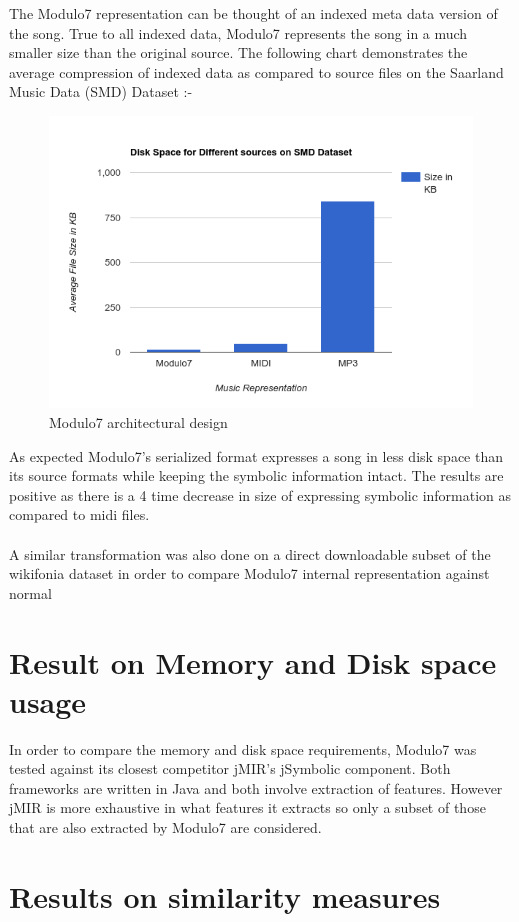 \noindent The Modulo7 representation can be thought of an indexed meta data version of the song. True to all indexed data, Modulo7 represents the song in a much smaller size than the original source. The following chart demonstrates the average compression of indexed data as compared to source files on the Saarland Music Data (SMD) Dataset \cite{saarlandmsd}:-
\begin{figure}
\centering
\includegraphics[width=\textwidth]{Modulo7SMDBarGraph.png}
\makeatletter
\let\@currsize\normalsize
\caption{Modulo7 architectural design}
\label{fig:figure}
\end{figure}
As expected Modulo7's serialized format expresses a song in less disk space than its source formats while keeping the symbolic information intact. The results are positive as there is a 4 time decrease in size of expressing symbolic information as compared to midi files. \\\\
A similar transformation was also done on a direct downloadable subset of the wikifonia dataset in order to compare Modulo7 internal representation against normal 

\section{Result on Memory and Disk space \\ usage}

\noindent In order to compare the memory and disk space requirements, Modulo7 was tested against its closest competitor jMIR's \cite{jMIR} jSymbolic component. Both frameworks are written in Java and both involve extraction of features. However jMIR is more exhaustive in what features it extracts so only a subset of those that are also extracted by Modulo7 are considered. 


\section{Results on similarity measures}